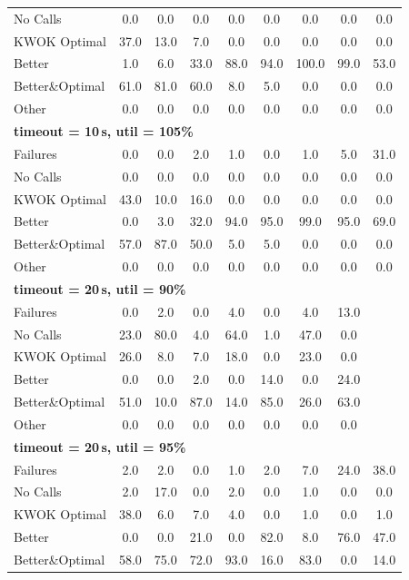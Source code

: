 \begin{tabular}{l cccccccc}
No Calls & 0.0 & 0.0 & 0.0 & 0.0 & 0.0 & 0.0 & 0.0 & 0.0 \\
KWOK Optimal & 37.0 & 13.0 & 7.0 & 0.0 & 0.0 & 0.0 & 0.0 & 0.0 \\
Better & 1.0 & 6.0 & 33.0 & 88.0 & 94.0 & 100.0 & 99.0 & 53.0 \\
Better\&Optimal & 61.0 & 81.0 & 60.0 & 8.0 & 5.0 & 0.0 & 0.0 & 0.0 \\
Other & 0.0 & 0.0 & 0.0 & 0.0 & 0.0 & 0.0 & 0.0 & 0.0 \\
\midrule
\multicolumn{9}{l}{\textbf{timeout = 10\,s, util = 105\%}} \\
\midrule
Failures & 0.0 & 0.0 & 2.0 & 1.0 & 0.0 & 1.0 & 5.0 & 31.0 \\
No Calls & 0.0 & 0.0 & 0.0 & 0.0 & 0.0 & 0.0 & 0.0 & 0.0 \\
KWOK Optimal & 43.0 & 10.0 & 16.0 & 0.0 & 0.0 & 0.0 & 0.0 & 0.0 \\
Better & 0.0 & 3.0 & 32.0 & 94.0 & 95.0 & 99.0 & 95.0 & 69.0 \\
Better\&Optimal & 57.0 & 87.0 & 50.0 & 5.0 & 5.0 & 0.0 & 0.0 & 0.0 \\
Other & 0.0 & 0.0 & 0.0 & 0.0 & 0.0 & 0.0 & 0.0 & 0.0 \\
\midrule
\multicolumn{9}{l}{\textbf{timeout = 20\,s, util = 90\%}} \\
\midrule
Failures & 0.0 & 2.0 & 0.0 & 4.0 & 0.0 & 4.0 & 13.0 & \text{--} \\
No Calls & 23.0 & 80.0 & 4.0 & 64.0 & 1.0 & 47.0 & 0.0 & \text{--} \\
KWOK Optimal & 26.0 & 8.0 & 7.0 & 18.0 & 0.0 & 23.0 & 0.0 & \text{--} \\
Better & 0.0 & 0.0 & 2.0 & 0.0 & 14.0 & 0.0 & 24.0 & \text{--} \\
Better\&Optimal & 51.0 & 10.0 & 87.0 & 14.0 & 85.0 & 26.0 & 63.0 & \text{--} \\
Other & 0.0 & 0.0 & 0.0 & 0.0 & 0.0 & 0.0 & 0.0 & \text{--} \\
\midrule
\multicolumn{9}{l}{\textbf{timeout = 20\,s, util = 95\%}} \\
\midrule
Failures & 2.0 & 2.0 & 0.0 & 1.0 & 2.0 & 7.0 & 24.0 & 38.0 \\
No Calls & 2.0 & 17.0 & 0.0 & 2.0 & 0.0 & 1.0 & 0.0 & 0.0 \\
KWOK Optimal & 38.0 & 6.0 & 7.0 & 4.0 & 0.0 & 1.0 & 0.0 & 1.0 \\
Better & 0.0 & 0.0 & 21.0 & 0.0 & 82.0 & 8.0 & 76.0 & 47.0 \\
Better\&Optimal & 58.0 & 75.0 & 72.0 & 93.0 & 16.0 & 83.0 & 0.0 & 14.0 \\

\end{tabular}
